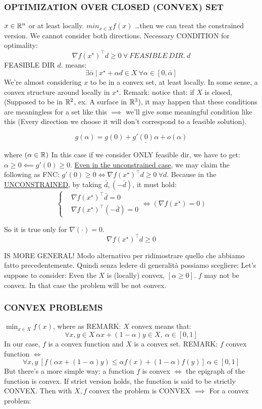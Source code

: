 \subsubsection{OPTIMIZATION OVER CLOSED (CONVEX) SET}

$x\in\mathbb{R}^n$ or at least locally. $min_{x\in X}{f(x)}$ \dots then we can treat the constrained version. We cannot consider both directions. Necessary CONDITION for optimality:
\[
	\nabla{f(x^\star)}^\top d \geq 0\ \forall\ FEASIBLE\ DIR.\ d
\]	
FEASIBLE DIR $d$. means:
\[
	\exists \bar{\alpha}\ |\ x^\star+\alpha d \in X\ \forall \alpha\in[0,\bar{\alpha}]
\]
We're almost considering $x$ to be in a convex set, at least locally. In some sense, a convex structure around locally in $x^\star$. Remark: notice that: if $X$ is closed, (Supposed to be in $\mathbb{R}^2$, ex. A surface in $\mathbb{R}^3$), it may happen that these conditions are meaningless for a set like this $\implies$ we'll give some meaningful condition like this (Every direction we choose it will don't correspond to a feasible solution).

\[
	g(\alpha) = g(0) + \underline{g'(0)\alpha} + o(\alpha)
\]

where $(\alpha\in\mathbb{R})$
In this case if we consider ONLY feasible dir, we have to get: $\alpha \geq 0 \impliedby g'(0) \geq 0$. \underline{Even in the unconstrained case}, we may claim the following as FNC: $g'(0)\geq 0 \iff \nabla{f(x^\star)}^\top d \geq 0\ \forall d$. Because in the \underline{UNCONSTRAINED}, by taking $\bar{d},(-\bar{d})$, it must hold:
\[
	\left\{
	\begin{aligned}
	&\nabla{f(x^\star)}^\top \bar{d}=0 \\
	&\nabla{f(x^\star)}^\top (-\bar{d})=0
	\end{aligned} 
	\right. \iff (\nabla{f(x^\star)} = 0)
\]

So it is true only for $\nabla(\mathord{\cdot})=0$.
\[
	\nabla{f(x^\star)}^\top d \geq 0
\]

IS MORE GENERAL!
Modo alternativo per ridimostrare quello che abbiamo fatto precedentemente. Quindi senza ledere di generalità possiamo scegliere: Let's suppose to consider: Even the $X$ is (locally) convex, $[\alpha\geq 0]$. $f$ may not be convex. In that case the problem will be not convex.

\subsubsection{CONVEX PROBLEMS}
 
$\min_{x\in X}{f(x)}$, where as REMARK: $X$ convex means that:
\[
	\forall x,y\in X\ \alpha x +(1-\alpha)y \in X,\ \alpha\in[0,1]
\]
In our case, $f$ is a convex function and $X$ is a convex set. REMARK: $f$ convex function $\iff$
\[
	\forall x,y\ [f(\alpha x+(1-\alpha)y) \leq \alpha f(x) +(1-\alpha)f(y)]\ \alpha\in[0,1]
\]
But there's a more simple way: a function $f$ is convex $\iff$ the epigraph of the function is convex. If strict version holds, the function is said to be strictly CONVEX. Then with $X,f$ convex the problem is CONVEX $\implies$ For a convex problem:

